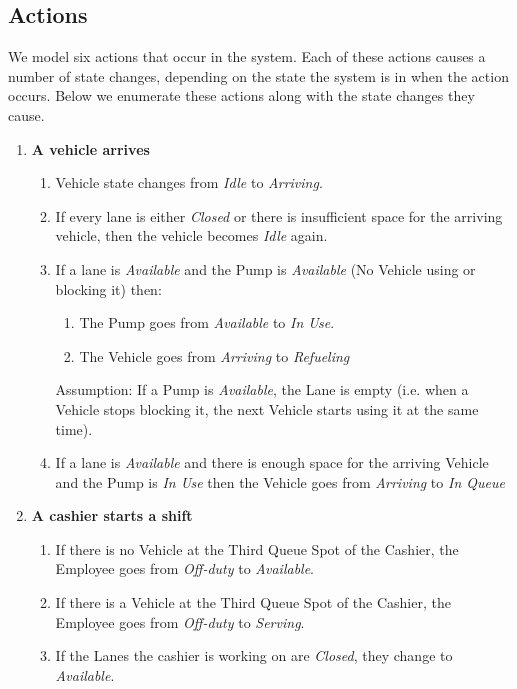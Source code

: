 \subsection{Actions}
We model six actions that occur in the system.
Each of these actions causes a number of state changes, depending on the state the system is in when the action occurs. 
Below we enumerate these actions along with the state changes they cause.

\begin{enumerate}
	\item \textbf{A vehicle arrives}
	\begin{enumerate}
		\item Vehicle state changes from \textit{Idle} to \textit{Arriving}.
		\item If every lane is either \textit{Closed} or there is insufficient space for the arriving vehicle, then the vehicle becomes \textit{Idle} again.
		\item If a lane is \textit{Available} and the Pump is \textit{Available} (No Vehicle using or blocking it) then:
	\begin{enumerate}
		\item The Pump goes from \textit{Available} to \textit{In Use}.
		\item The Vehicle goes from \textit{Arriving} to \textit{Refueling}
	\end{enumerate}
	Assumption: If a Pump is \textit{Available}, the Lane is empty (i.e. when a Vehicle stops blocking it, the next Vehicle starts using it at the same time).
	\item If a lane is \textit{Available} and there is enough space for the arriving Vehicle and the Pump is \textit{In Use} then the Vehicle goes from \textit{Arriving} to \textit{In Queue}
	\end{enumerate}
	
	\item \textbf{A cashier starts a shift}
	\begin{enumerate}
		\item If there is no Vehicle at the Third Queue Spot of the Cashier, the Employee goes from \textit{Off-duty} to \textit{Available}.
		\item If there is a Vehicle at the Third Queue Spot of the Cashier, the Employee goes from \textit{Off-duty} to \textit{Serving}.
		\item If the Lanes the cashier is working on are \textit{Closed}, they change to \textit{Available}.
	\end{enumerate}
	

\end{enumerate}
